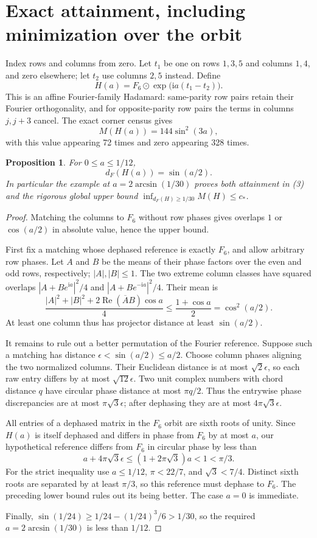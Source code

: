 \documentclass[11pt]{article}
\newtheorem{proposition}[theorem]{Proposition}
\newcommand{\ii}{\mathrm i}
\begin{document}
\section{Exact attainment, including minimization over the orbit}
Index rows and columns from zero. Let $t_1$ be one on rows $1,3,5$
and columns $1,4$, and zero elsewhere; let $t_2$ use columns $2,5$
instead. Define
\[
 H(a)=F_6\odot\exp\bigl(\ii a(t_1-t_2)\bigr).
\]
This is an affine Fourier-family Hadamard: same-parity row pairs retain
their Fourier orthogonality, and for opposite-parity row pairs the terms
in columns $j,j+3$ cancel. The exact corner census gives
\[
 M(H(a))=144\sin^2(3a),\tag{5}
\]
with this value appearing 72 times and zero appearing 328 times.

\begin{proposition}
For $0\le a\le1/12$,
\[
 d_F(H(a))=\sin(a/2).\tag{6}
\]
In particular the example at $a=2\arcsin(1/30)$ proves both attainment
in (3) and the rigorous global upper bound
$\inf_{d_F(H)\ge1/30}M(H)\le c_*$.
\end{proposition}

\begin{proof}
Matching the columns to $F_6$ without row phases gives overlaps
$1$ or $\cos(a/2)$ in absolute value, hence the upper bound.

First fix a matching whose dephased reference is exactly $F_6$, and
allow arbitrary row phases. Let $A$ and $B$ be the means of their
phase factors over the even and odd rows, respectively; $|A|,|B|\le1$.
The two extreme column classes have squared overlaps
$|A+Be^{\ii a}|^2/4$ and $|A+Be^{-\ii a}|^2/4$.
Their mean is
\[
 \frac{|A|^2+|B|^2+2\operatorname{Re}(\overline A B)\cos a}{4}
 \le\frac{1+\cos a}{2}=\cos^2(a/2).
\]
At least one column thus has projector distance at least $\sin(a/2)$.

It remains to rule out a better permutation of the Fourier reference.
Suppose such a matching has distance $\epsilon<\sin(a/2)\le a/2$.
Choose column phases aligning the two normalized columns. Their
Euclidean distance is at most $\sqrt2\epsilon$, so each raw entry
differs by at most $\sqrt{12}\epsilon$. Two unit complex numbers with
chord distance $q$ have circular phase distance at most $\pi q/2$.
Thus the entrywise phase discrepancies are at most
$\pi\sqrt3\epsilon$; after dephasing they are at most
$4\pi\sqrt3\epsilon$.

All entries of a dephased matrix in the $F_6$ orbit are sixth roots
of unity. Since $H(a)$ is itself dephased and differs in phase from
$F_6$ by at most $a$, our hypothetical reference differs from $F_6$
in circular phase by less than
\[
 a+4\pi\sqrt3\epsilon\le(1+2\pi\sqrt3)a<1<\pi/3.
\]
For the strict inequality use $a\le1/12$, $\pi<22/7$, and
$\sqrt3<7/4$. Distinct sixth roots are separated by at least $\pi/3$,
so this reference must dephase to $F_6$. The preceding lower bound
rules out its being better. The case $a=0$ is immediate.

Finally, $\sin(1/24)\ge1/24-(1/24)^3/6>1/30$, so the required
$a=2\arcsin(1/30)$ is less than $1/12$.
\end{proof}
\end{document}
